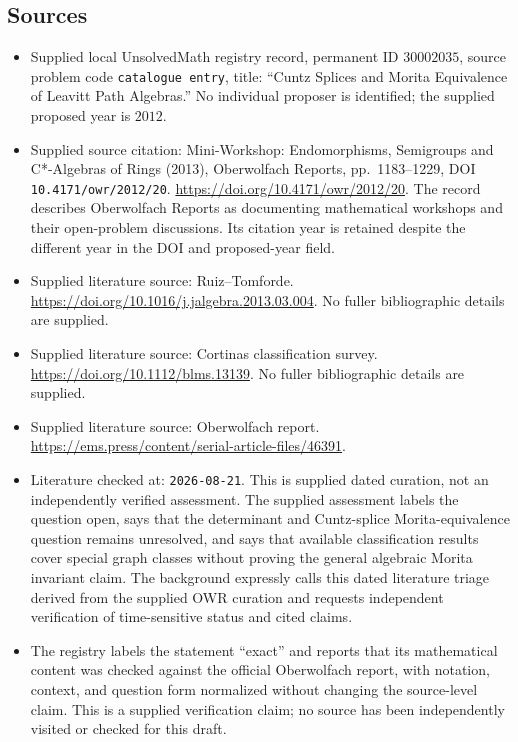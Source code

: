 \documentclass[11pt]{article}
\begin{document}
\subsection{Sources}
\begin{itemize}
\item Supplied local UnsolvedMath registry record, permanent ID \(30002035\), source problem code \texttt{catalogue entry}, title: ``Cuntz Splices and Morita Equivalence of Leavitt Path Algebras.'' No individual proposer is identified; the supplied proposed year is \(2012\).
\item Supplied source citation: Mini-Workshop: Endomorphisms, Semigroups and C*-Algebras of Rings (2013), Oberwolfach Reports, pp.\ 1183--1229, DOI \texttt{10.4171/owr/2012/20}. \url{https://doi.org/10.4171/owr/2012/20}. The record describes Oberwolfach Reports as documenting mathematical workshops and their open-problem discussions. Its citation year is retained despite the different year in the DOI and proposed-year field.
\item Supplied literature source: Ruiz--Tomforde. \url{https://doi.org/10.1016/j.jalgebra.2013.03.004}. No fuller bibliographic details are supplied.
\item Supplied literature source: Cortinas classification survey. \url{https://doi.org/10.1112/blms.13139}. No fuller bibliographic details are supplied.
\item Supplied literature source: Oberwolfach report. \url{https://ems.press/content/serial-article-files/46391}.
\item Literature checked at: \texttt{2026-08-21}. This is supplied dated curation, not an independently verified assessment. The supplied assessment labels the question open, says that the determinant and Cuntz-splice Morita-equivalence question remains unresolved, and says that available classification results cover special graph classes without proving the general algebraic Morita invariant claim. The background expressly calls this dated literature triage derived from the supplied OWR curation and requests independent verification of time-sensitive status and cited claims.
\item The registry labels the statement ``exact'' and reports that its mathematical content was checked against the official Oberwolfach report, with notation, context, and question form normalized without changing the source-level claim. This is a supplied verification claim; no source has been independently visited or checked for this draft.
\end{itemize}
\end{document}
